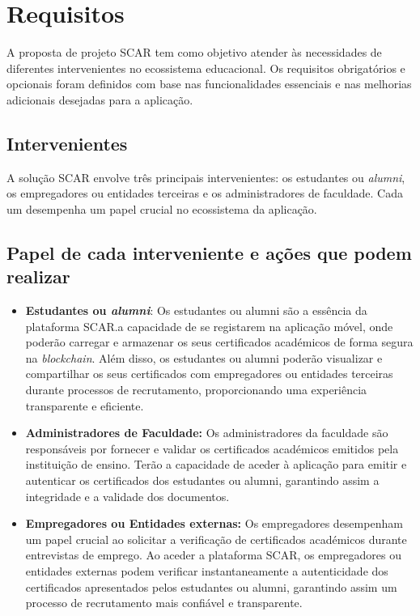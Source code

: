 \documentclass[10pt]{article}
\begin{document}
\section{Requisitos}

A proposta de projeto SCAR tem como objetivo atender às necessidades de diferentes intervenientes no ecossistema educacional.
Os requisitos obrigatórios e opcionais foram definidos com base nas funcionalidades essenciais e nas melhorias adicionais
desejadas para a aplicação.

\subsection*{Intervenientes}

A solução SCAR envolve três principais intervenientes: os estudantes ou \textit{alumni}, os empregadores ou entidades terceiras e os administradores
de faculdade. Cada um desempenha um papel crucial no ecossistema da aplicação.

\subsection*{Papel de cada interveniente e ações que podem realizar}

\begin{itemize}

    \item \textbf{Estudantes ou \textit{alumni}}: Os estudantes ou alumni são a essência da plataforma SCAR. a capacidade de se registarem na
          aplicação móvel, onde poderão carregar e armazenar os seus certificados académicos de forma segura na \textit{blockchain}.
          Além disso, os estudantes ou alumni poderão visualizar e compartilhar os seus certificados com empregadores ou entidades terceiras durante processos
          de recrutamento, proporcionando uma experiência transparente e eficiente.

    \item \textbf{Administradores de Faculdade:} Os administradores da faculdade são responsáveis por fornecer e validar
          os certificados académicos emitidos pela instituição de ensino. Terão a capacidade de aceder à aplicação
          para emitir e autenticar os certificados dos estudantes ou alumni, garantindo assim a integridade e a validade dos documentos.

    \item \textbf{Empregadores ou Entidades externas:} Os empregadores desempenham um papel crucial ao solicitar a verificação de certificados
          académicos durante entrevistas de emprego. Ao aceder a plataforma SCAR, os empregadores ou entidades externas podem verificar
          instantaneamente a autenticidade dos certificados apresentados pelos estudantes ou alumni, garantindo assim um processo
          de recrutamento mais confiável e transparente.

\end{itemize}
\end{document}
